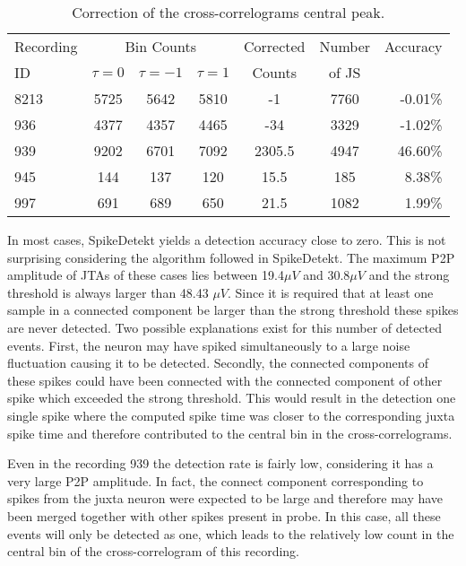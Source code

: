 \begin{table}[!h]
\begin{center}
\begin{tabular}{p{1.5cm}cccccr} %

\multicolumn{ 1}{p{1.5cm}}{Recording } & \multicolumn{ 3}{c}{Bin Counts} &  \multicolumn{ 1}{p{1.3cm}}{Corrected} & \multicolumn{ 1}{c}{Number} & \multicolumn{ 1}{c}{Accuracy} \\ 
\multicolumn{ 1}{l}{ID} & $\tau=0$ & $\tau=-1$ & $\tau=1$ & \multicolumn{ 1}{c}{Counts} & \multicolumn{ 1}{p{1.3cm}}{of JS} & \multicolumn{ 1}{l}{} \\ \hline
8213 & 5725 & 5642 & 5810 & -1 & 7760 & -0.01\% \\
936 & 4377 & 4357 & 4465 & -34 & 3329 & -1.02\% \\
939 & 9202 & 6701 & 7092 & 2305.5 & 4947 & 46.60\% \\
945 & 144 & 137 & 120 & 15.5 & 185 & 8.38\% \\ 
997 & 691 & 689 & 650 & 21.5 & 1082 & 1.99\% \\ 
\end{tabular}
\end{center}
\caption{Correction of the cross-correlograms central peak.}
\label{tab:CCcorrection}
\end{table}


In most cases, SpikeDetekt yields a detection accuracy close to zero. This is not surprising considering the algorithm followed in SpikeDetekt. The maximum P2P amplitude of JTAs of these cases lies between 19.4$\mu V$ and 30.8$\mu V$ and the strong threshold is always larger than 48.43 $\mu V$. Since it is required that at least one sample in a connected component be larger than the strong threshold these spikes are never detected. Two possible explanations exist for this number of detected events. First, the neuron may have spiked simultaneously to a large noise fluctuation causing it to be detected. Secondly, the connected components of these spikes could have been connected with the connected component of other spike which exceeded the strong threshold. This would result in the detection one single spike where the computed spike time was closer to the corresponding juxta spike time and therefore contributed to the central bin in the cross-correlograms.

Even in the recording 939 the detection rate is fairly low, considering it has a very large P2P amplitude. In fact, the connect component corresponding to spikes from the juxta neuron were expected to be large and therefore may have been merged together with other spikes present in probe. In this case, all these events will only be detected as one, which leads to the relatively low count in the central bin of the cross-correlogram of this recording.

